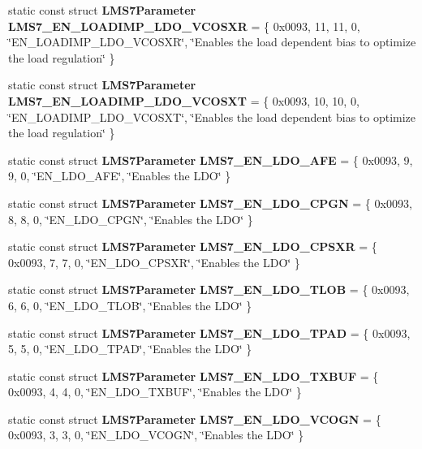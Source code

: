 \begin{DoxyCompactItemize}
\item 
static const struct {\bf L\+M\+S7\+Parameter} {\bf L\+M\+S7\+\_\+\+E\+N\+\_\+\+L\+O\+A\+D\+I\+M\+P\+\_\+\+L\+D\+O\+\_\+\+V\+C\+O\+S\+XR} = \{ 0x0093, 11, 11, 0, \char`\"{}\+E\+N\+\_\+\+L\+O\+A\+D\+I\+M\+P\+\_\+\+L\+D\+O\+\_\+\+V\+C\+O\+S\+X\+R\char`\"{}, \char`\"{}\+Enables the load dependent bias to optimize the load regulation\char`\"{} \}
\item 
static const struct {\bf L\+M\+S7\+Parameter} {\bf L\+M\+S7\+\_\+\+E\+N\+\_\+\+L\+O\+A\+D\+I\+M\+P\+\_\+\+L\+D\+O\+\_\+\+V\+C\+O\+S\+XT} = \{ 0x0093, 10, 10, 0, \char`\"{}\+E\+N\+\_\+\+L\+O\+A\+D\+I\+M\+P\+\_\+\+L\+D\+O\+\_\+\+V\+C\+O\+S\+X\+T\char`\"{}, \char`\"{}\+Enables the load dependent bias to optimize the load regulation\char`\"{} \}
\item 
static const struct {\bf L\+M\+S7\+Parameter} {\bf L\+M\+S7\+\_\+\+E\+N\+\_\+\+L\+D\+O\+\_\+\+A\+FE} = \{ 0x0093, 9, 9, 0, \char`\"{}\+E\+N\+\_\+\+L\+D\+O\+\_\+\+A\+F\+E\char`\"{}, \char`\"{}\+Enables the L\+D\+O\char`\"{} \}
\item 
static const struct {\bf L\+M\+S7\+Parameter} {\bf L\+M\+S7\+\_\+\+E\+N\+\_\+\+L\+D\+O\+\_\+\+C\+P\+GN} = \{ 0x0093, 8, 8, 0, \char`\"{}\+E\+N\+\_\+\+L\+D\+O\+\_\+\+C\+P\+G\+N\char`\"{}, \char`\"{}\+Enables the L\+D\+O\char`\"{} \}
\item 
static const struct {\bf L\+M\+S7\+Parameter} {\bf L\+M\+S7\+\_\+\+E\+N\+\_\+\+L\+D\+O\+\_\+\+C\+P\+S\+XR} = \{ 0x0093, 7, 7, 0, \char`\"{}\+E\+N\+\_\+\+L\+D\+O\+\_\+\+C\+P\+S\+X\+R\char`\"{}, \char`\"{}\+Enables the L\+D\+O\char`\"{} \}
\item 
static const struct {\bf L\+M\+S7\+Parameter} {\bf L\+M\+S7\+\_\+\+E\+N\+\_\+\+L\+D\+O\+\_\+\+T\+L\+OB} = \{ 0x0093, 6, 6, 0, \char`\"{}\+E\+N\+\_\+\+L\+D\+O\+\_\+\+T\+L\+O\+B\char`\"{}, \char`\"{}\+Enables the L\+D\+O\char`\"{} \}
\item 
static const struct {\bf L\+M\+S7\+Parameter} {\bf L\+M\+S7\+\_\+\+E\+N\+\_\+\+L\+D\+O\+\_\+\+T\+P\+AD} = \{ 0x0093, 5, 5, 0, \char`\"{}\+E\+N\+\_\+\+L\+D\+O\+\_\+\+T\+P\+A\+D\char`\"{}, \char`\"{}\+Enables the L\+D\+O\char`\"{} \}
\item 
static const struct {\bf L\+M\+S7\+Parameter} {\bf L\+M\+S7\+\_\+\+E\+N\+\_\+\+L\+D\+O\+\_\+\+T\+X\+B\+UF} = \{ 0x0093, 4, 4, 0, \char`\"{}\+E\+N\+\_\+\+L\+D\+O\+\_\+\+T\+X\+B\+U\+F\char`\"{}, \char`\"{}\+Enables the L\+D\+O\char`\"{} \}
\item 
static const struct {\bf L\+M\+S7\+Parameter} {\bf L\+M\+S7\+\_\+\+E\+N\+\_\+\+L\+D\+O\+\_\+\+V\+C\+O\+GN} = \{ 0x0093, 3, 3, 0, \char`\"{}\+E\+N\+\_\+\+L\+D\+O\+\_\+\+V\+C\+O\+G\+N\char`\"{}, \char`\"{}\+Enables the L\+D\+O\char`\"{} \}

\end{DoxyCompactItemize}
